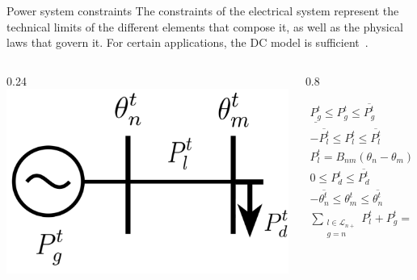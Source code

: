 \documentclass[hyperref={colorlinks,citecolor=blue,linkcolor=blue,urlcolor=blue}]{beamer}
\begin{document}
\begin{frame}{Power system constraints}
\footnotesize
The constraints of the electrical system represent the technical limits of the different elements that compose it, as well as the physical laws that govern it. For certain applications, the DC model is sufficient~\cite{8468081}.
\begin{columns}
\begin{column}{0.24\textwidth}
\vspace{3pt}
    \includegraphics[width=1.4\textwidth]{figures/power_dummy_constraint.png}
\end{column}
\begin{column}{0.8\textwidth}  %


\begin{subequations}
\begin{alignat}{2}
    \underline{P_g^t} \leq P_{g}^t \leq \overline{P_g^t} &\quad &\forall \ g \in \mathcal{G}, \label{eq:gen_limits} \\
    -\overline{P_l^t} \leq P_{l}^t \leq \overline{P_l^t} &\quad &\forall \ l \in \mathcal{L}, \label{eq:line_limits} \\
    P_{l}^t = B_{nm}(\theta_n - \theta_{m}) &\quad &\forall \ l = (n, m) \in \mathcal{L}, \label{eq:dc_power_flow} \\
    0 \leq P_{d}^t \leq \overline{P_{d}^t} &\quad &\forall \ d \in \mathcal{D}, \label{eq:dem_limit_power} \\
    -\overline{\theta_{n}^t} \leq \theta_{m}^t \leq \overline{\theta_{n}^t} &\quad &\forall \ n \in \mathcal{N}_P, \label{eq:voltage_angle_limits} \\
    \sum_{\substack{l\in \mathcal{L}_{n+}\\g=n}}{P_{l}^t + P_{g}^t} = \sum_{\substack{l\in \mathcal{L}_{n-}\\d=n}} P_{l}^t + P_{d}^t &\quad &\forall \ n \in \mathcal{N}_P \label{eq:power_balance}
\end{alignat}
\end{subequations}
\end{column}
\end{columns}


\end{frame}
\end{document}
